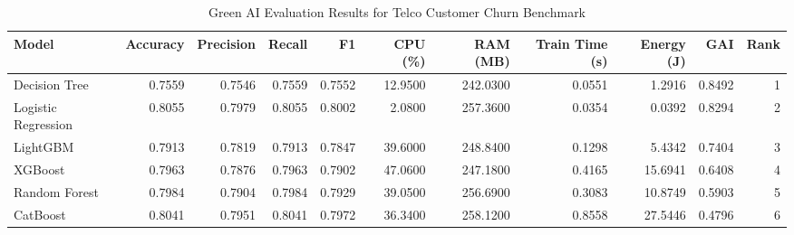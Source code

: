 \begin{table}[htbp]
\caption{Green AI Evaluation Results for Telco Customer Churn Benchmark}
\label{tab:telco_churn_results}
\begin{tabular}{lrrrrrrrrrr}
\toprule
Model & Accuracy & Precision & Recall & F1 & CPU (\%) & RAM (MB) & Train Time (s) & Energy (J) & GAI & Rank \\
\midrule
Decision Tree & 0.7559 & 0.7546 & 0.7559 & 0.7552 & 12.9500 & 242.0300 & 0.0551 & 1.2916 & 0.8492 & 1 \\
Logistic Regression & 0.8055 & 0.7979 & 0.8055 & 0.8002 & 2.0800 & 257.3600 & 0.0354 & 0.0392 & 0.8294 & 2 \\
LightGBM & 0.7913 & 0.7819 & 0.7913 & 0.7847 & 39.6000 & 248.8400 & 0.1298 & 5.4342 & 0.7404 & 3 \\
XGBoost & 0.7963 & 0.7876 & 0.7963 & 0.7902 & 47.0600 & 247.1800 & 0.4165 & 15.6941 & 0.6408 & 4 \\
Random Forest & 0.7984 & 0.7904 & 0.7984 & 0.7929 & 39.0500 & 256.6900 & 0.3083 & 10.8749 & 0.5903 & 5 \\
CatBoost & 0.8041 & 0.7951 & 0.8041 & 0.7972 & 36.3400 & 258.1200 & 0.8558 & 27.5446 & 0.4796 & 6 \\
\bottomrule
\end{tabular}
\end{table}
